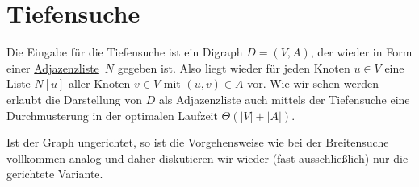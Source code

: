 \section{Tiefensuche}
\label{sect:tiefensuche}


\begin{bem} 
Die Eingabe für die Tiefensuche ist ein Digraph $D=(V,A)$, der wieder in Form einer \underline{Adjazenzliste}~$N$ gegeben ist.
Also liegt wieder für jeden Knoten $u \in V$ eine Liste $N[u]$ aller Knoten $v \in V$ mit $(u,v) \in A$ vor.
Wie wir sehen werden erlaubt die Darstellung von $D$ als Adjazenzliste auch mittels der Tiefensuche eine Durchmusterung in der optimalen Laufzeit $\Theta(|V|+|A|)$.

Ist der Graph ungerichtet, so ist die Vorgehensweise wie bei der Breitensuche vollkommen analog und daher diskutieren wir wieder (fast ausschließlich) nur die gerichtete Variante.
\end{bem}


